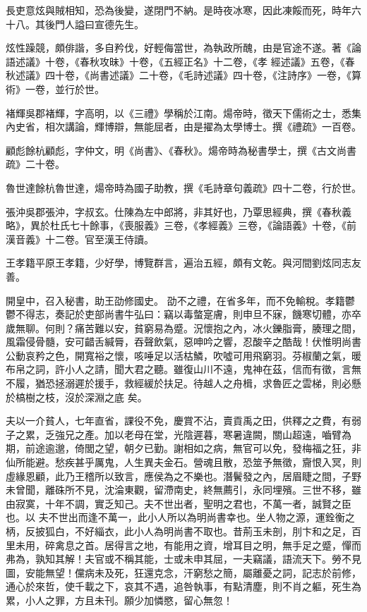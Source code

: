 \begin{pinyinscope}
 長吏意炫與賊相知，恐為後變，遂閉門不納。是時夜冰寒，因此凍餒而死，時年六十八。其後門人謚曰宣德先生。



 炫性躁競，頗俳諧，多自矜伐，好輕侮當世，為執政所醜，由是官途不遂。著《論語述議》十卷，《春秋攻昧》十卷，《五經正名》十二卷，《孝
 經述議》五卷，《春秋述議》四十卷，《尚書述議》二十卷，《毛詩述議》四十卷，《注詩序》一卷，《算術》一卷，並行於世。



 褚輝吳郡褚輝，字高明，以《三禮》學稱於江南。煬帝時，徵天下儒術之士，悉集內史省，相次講論，輝博辯，無能屈者，由是擢為太學博士。撰《禮疏》一百卷。



 顧彪餘杭顧彪，字仲文，明《尚書》、《春秋》。煬帝時為秘書學士，撰《古文尚書疏》二十卷。



 魯世達餘杭魯世達，煬帝時為國子助教，撰《毛詩章句義疏》四十二卷，行於世。



 張沖吳郡張沖，字叔玄。仕陳為左中郎將，非其好也，乃覃思經典，撰《春秋義略》，異於杜氏七十餘事，《喪服義》三卷，《孝經義》三卷，《論語義》十卷，《前漢音義》十二卷。官至漢王侍讀。



 王孝籍平原王孝籍，少好學，博覽群言，遍治五經，頗有文乾。與河間劉炫同志友善。



 開皇中，召入秘書，助王劭修國史。
 劭不之禮，在省多年，而不免輸稅。孝籍鬱鬱不得志，奏記於吏部尚書牛弘曰：竊以毒螫寔膚，則申旦不寐，饑寒切體，亦卒歲無聊。何則？痛苦難以安，貧窮易為蹙。況懷抱之內，冰火鑠脂膏，腠理之間，風霜侵骨髓，安可齰舌緘脣，吞聲飲氣，惡呻吟之響，忍酸辛之酷哉！伏惟明尚書公動哀矜之色，開寬裕之懷，咳唾足以活枯鱗，吹噓可用飛窮羽。芬椒蘭之氣，暖布帛之詞，許小人之請，聞大君之聽。雖復山川不遠，鬼神在茲，信而有徵，言無不履，猶恐拯溺遲於援手，救經緩於扶足。待越人之舟楫，求魯匠之雲梯，則必懸於槁樹之枝，沒於深淵之底
 矣。



 夫以一介貧人，七年直省，課役不免，慶賞不沾，賣貢禹之田，供釋之之費，有弱子之累，乏強兄之產。加以老母在堂，光陰遲暮，寒暑違闕，關山超遠，嚙臂為期，前途逾邈，倚閭之望，朝夕已勤。謝相如之病，無官可以免，發梅福之狂，非仙所能避。愁疾甚乎厲鬼，人生異夫金石。營魂且散，恐筮予無徵，齎恨入冥，則虛緣恩顧，此乃王稽所以致言，應侯為之不樂也。潛鬢發之內，居眉睫之間，子野未曾聞，離硃所不見，沈淪東觀，留滯南史，終無薦引，永同埋殯。三世不移，雖由寂寞，十年不調，實乏知己。夫不世出者，聖明之君也，不萬一者，誠賢之臣也。以
 夫不世出而逢不萬一，此小人所以為明尚書幸也。坐人物之源，運銓衡之柄，反披狐白，不好緇衣，此小人為明尚書不取也。昔荊玉未剖，刖卞和之足，百里未用，碎禽息之首。居得言之地，有能用之資，增耳目之明，無手足之蹙，憚而弗為，孰知其解！夫官或不稱其能，士或未申其屈，一夫竊議，語流天下。勞不見圖，安能無望！儻病未及死，狂還克念，汗窮愁之簡，屬離憂之詞，記志於前修，通心於來哲，使千載之下，哀其不遇，追咎執事，有點清塵，則不肖之軀，死生為累，小人之罪，方且未刊。願少加憐愍，留心無忽！




\end{pinyinscope}
